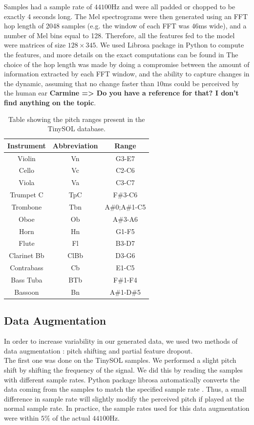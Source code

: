 \documentclass{article}
\newcommand{\carmine}[1]{\textbf{\color{red} Carmine => #1}}
\begin{document}
Samples had a sample rate of $44100$Hz and were all padded or chopped to be exactly 4 seconds long. The Mel spectrograms were then generated using an FFT hop length of 2048 samples (e.g. the window of each FFT was $46$ms wide), and a number of Mel bins equal to 128. Therefore, all the features fed to the model were matrices of size $128\times 345$. We used Librosa package in Python to compute the features, and more details on the exact computations can be found in \cite{mcfee15} The choice of the hop length was made by doing a compromise between the amount of information extracted by each FFT window, and the ability to capture changes in the dynamic, assuming that no change faster than $10$ms could be perceived by the human ear \carmine{Do you have a reference for that? I don't find anything on the topic}.

\begin{table}
\begin{tabular}{|c|c|c|}
\hline
Instrument & Abbreviation & Range \\
\hline
Violin & Vn & G3-E7\\
Cello & Vc & C2-C6\\
Viola & Va & C3-C7\\
Trumpet C & TpC & F\#3-C6\\
Trombone & Tbn & A\#0;A\#1-C5\\
Oboe & Ob & A\#3-A6\\
Horn & Hn & G1-F5\\
Flute & Fl & B3-D7\\
Clarinet Bb & ClBb & D3-G6\\
Contrabass & Cb & E1-C5\\
Bass Tuba & BTb & F\#1-F4\\
Bassoon & Bn & A\#1-D\#5\\
\hline
\end{tabular}
\caption{Table showing the pitch ranges present in the TinySOL database.\label{tinysol}}
\end{table}

\subsection{Data Augmentation}

In order to increase variability in our generated data, we used two methods of data augmentation \cite{Salamon17}\cite{Bhardwaj17} : pitch shifting and partial feature dropout.\\

The first one was done on the TinySOL samples. We performed a slight pitch shift by shifting the frequency of the signal. We did this by reading the samples with different sample rates. Python package librosa automatically converts the data coming from the samples to match the specified sample rate \cite{mcfee15}. Thus, a small difference in sample rate will slightly modify the perceived pitch if played at the normal sample rate. In practice, the sample rates used for this data augmentation were within $5\%$ of the actual $44100$Hz.\\
\end{document}
